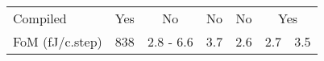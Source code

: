 \begin{table}[tb]
\begin{table}[tb]
\begin{tabular}{  l  c  c  c  c  c c  }
  \midrule
  Compiled & Yes & No & No & No & \multicolumn{2}{c}{Yes}  \\
  FoM (fJ/c.step) & 838 & 2.8 - 6.6 & 3.7 & 2.6 & 2.7 & 3.5 \\
  \bottomrule
\end{tabular}
\end{table}
\end{table}




